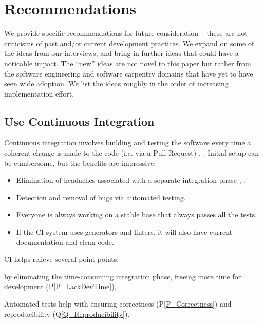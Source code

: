\documentclass[doubleblind,12pt, 3p, times]{elsarticle}
\newcommand{\ppref}[1]{P\ref{#1}}
\newcommand{\qref}[1]{Q\ref{#1}}
\begin{document}
\section{Recommendations} \label{ch_recommendations}

We provide specific recommendations for future consideration -- these are
not criticisms of past and/or current development practices. We
expand on some of the ideas from our interviews, and bring in further ideas
that could have a noticable impact. The ``new'' ideas are not novel to this
paper but rather from the software engineering and software carpentry domains
that have yet to have seen wide adoption.  We list the ideas roughly in the
order of increasing implementation effort.

\subsection{Use Continuous Integration} \label{Sec_ContinuousIntegration}

Continuous integration involves building and testing the software every
time a coherent change is made to the code (i.e. via a Pull Request)%
\cite[p.\ 13] {HumbleAndFarley2010}, \cite{ShahinEtAl2017, Fowler2006}. Initial
setup can be cumbersome, but
the benefits are impressive:
\begin{itemize}
    \item Elimination of headaches associated with a separate integration phase
    \cite{Fowler2006}, \cite[p.\ 20]{HumbleAndFarley2010}.
    \item Detection and removal of bugs \cite{Fowler2006} via
    automated testing.  
    \item Everyone is always working on a stable base that always passes all
    the tests.
    \item If the CI system uses generators and linters, it will also have
    current documentation and clean code.
\end{itemize}

CI helps relieve several point points:
\begin{enumerate*}
\item by eliminating the time-consuming integration phase, 
freeing more time for development (\ppref{P_LackDevTime}),
\item Automated tests help with ensuring
correctness (\ppref{P_Correctness}) and reproducibility
(\qref{Q_Reproducibility}). 
\end{enumerate*}
\end{document}

